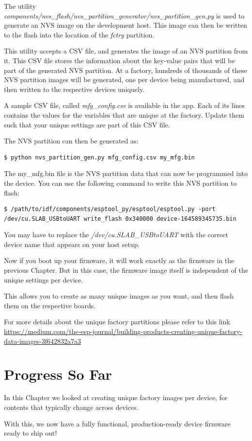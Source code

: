 \documentclass[main.tex]{subfiles}
\begin{document}
The utility \textit{components/nvs\_flash/nvs\_partition\_generator/nvs\_partition\_gen.py} is used to generate an NVS image on the development host. This image can then be written to the flash into the location of the \textit{fctry} partition.

This utility accepts a CSV file, and generates the image of an NVS partition from it. This CSV file stores the information about the key-value pairs that will be part of the generated NVS partition. At a factory, hundreds of thousands of these NVS partition images will be generated, one per device being manufactured, and then written to the respective devices uniquely.

A sample CSV file, called \textit{mfg\_config.csv} is available in the app. Each of its lines contains the values for the variables that are unique at the factory.
Update them such that your unique settings are part of this CSV file.

The NVS partition can then be generated as:
\begin{verbatim}
$ python nvs_partition_gen.py mfg_config.csv my_mfg.bin
\end{verbatim}

The my\_mfg.bin file is the NVS partition data that can now be programmed into the device. You can use the following command to write this NVS partition to flash:
\begin{verbatim}
$ /path/to/idf/components/esptool_py/esptool/esptool.py -port /dev/cu.SLAB_USBtoUART write_flash 0x340000 device-164589345735.bin
\end{verbatim}
You may have to replace the \textit{/dev/cu.SLAB\_USBtoUART} with the correct device name that appears on your host setup.

Now if you boot up your firmware, it will work exactly as the firmware in the previous Chapter. But in this case, the firmware image itself is independent of the unique settings per device. 

This allows you to create as many unique images as you want, and then flash them on the respective boards.

For more details about the unique factory partitions please refer to this link \url{https://medium.com/the-esp-journal/building-products-creating-unique-factory-data-images-3f642832a7a3}

\section{Progress So Far}
In this Chapter we looked at creating unique factory images per device, for contents that typically change across devices.

With this, we now have a fully functional, production-ready device firmware ready to ship out!
\end{document}
